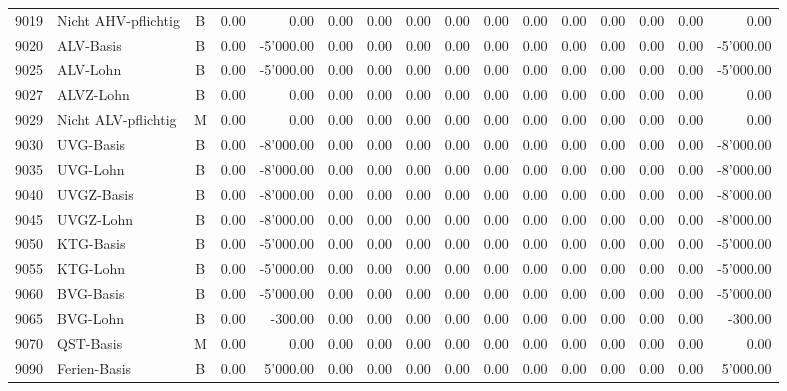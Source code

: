 \documentclass[8pt,a4paper]{extarticle}
\begin{document}
\begin{longtable}{@{\extracolsep{\fill}} l l c r r r r r r r r r r r r r}
9019&Nicht AHV-pflichtig&B&0.00&0.00&0.00&0.00&0.00&0.00&0.00&0.00&0.00&0.00&0.00&0.00&0.00\\
9020&ALV-Basis&B&0.00&-5'000.00&0.00&0.00&0.00&0.00&0.00&0.00&0.00&0.00&0.00&0.00&-5'000.00\\
9025&ALV-Lohn&B&0.00&-5'000.00&0.00&0.00&0.00&0.00&0.00&0.00&0.00&0.00&0.00&0.00&-5'000.00\\
9027&ALVZ-Lohn&B&0.00&0.00&0.00&0.00&0.00&0.00&0.00&0.00&0.00&0.00&0.00&0.00&0.00\\
9029&Nicht ALV-pflichtig&M&0.00&0.00&0.00&0.00&0.00&0.00&0.00&0.00&0.00&0.00&0.00&0.00&0.00\\
9030&UVG-Basis&B&0.00&-8'000.00&0.00&0.00&0.00&0.00&0.00&0.00&0.00&0.00&0.00&0.00&-8'000.00\\
9035&UVG-Lohn&B&0.00&-8'000.00&0.00&0.00&0.00&0.00&0.00&0.00&0.00&0.00&0.00&0.00&-8'000.00\\
9040&UVGZ-Basis&B&0.00&-8'000.00&0.00&0.00&0.00&0.00&0.00&0.00&0.00&0.00&0.00&0.00&-8'000.00\\
9045&UVGZ-Lohn&B&0.00&-8'000.00&0.00&0.00&0.00&0.00&0.00&0.00&0.00&0.00&0.00&0.00&-8'000.00\\
9050&KTG-Basis&B&0.00&-5'000.00&0.00&0.00&0.00&0.00&0.00&0.00&0.00&0.00&0.00&0.00&-5'000.00\\
9055&KTG-Lohn&B&0.00&-5'000.00&0.00&0.00&0.00&0.00&0.00&0.00&0.00&0.00&0.00&0.00&-5'000.00\\
9060&BVG-Basis&B&0.00&-5'000.00&0.00&0.00&0.00&0.00&0.00&0.00&0.00&0.00&0.00&0.00&-5'000.00\\
9065&BVG-Lohn&B&0.00&-300.00&0.00&0.00&0.00&0.00&0.00&0.00&0.00&0.00&0.00&0.00&-300.00\\
9070&QST-Basis&M&0.00&0.00&0.00&0.00&0.00&0.00&0.00&0.00&0.00&0.00&0.00&0.00&0.00\\
9090&Ferien-Basis&B&0.00&5'000.00&0.00&0.00&0.00&0.00&0.00&0.00&0.00&0.00&0.00&0.00&5'000.00\\

\end{longtable}
\pagebreak
\end{document}
